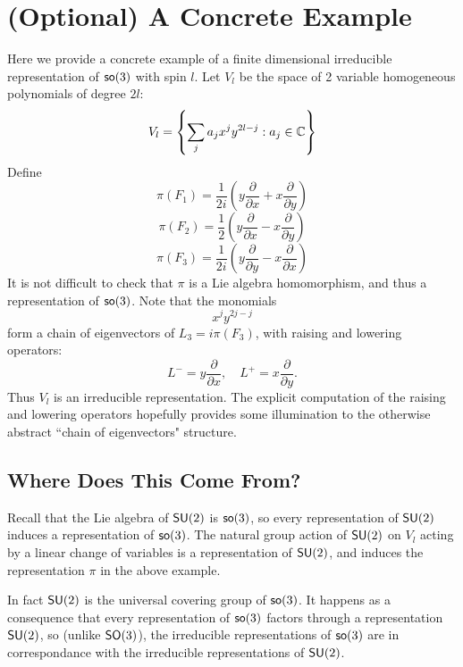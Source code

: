 \section{(Optional) A Concrete Example}
Here we provide a concrete example of a finite dimensional irreducible representation of $\operatorname{\textsf{so}}(3)$ with spin $l$. Let $V_l$ be the space of 2 variable homogeneous polynomials of degree $2l$:
\[
    V_l = \left\{ \sum_j a_j x^{j}y^{2l-j} : a_j \in {\mathbb C} \right\}
\]
Define
\[
    \pi(F_1) = \frac{1}{2i}\left(y \frac{\partial}{\partial x} + x \frac{\partial}{\partial y}\right)
\]
\[
    \pi(F_2) = \frac{1}{2}\left(y \frac{\partial}{\partial x} - x \frac{\partial}{\partial y}\right)
\]
\[
    \pi(F_3) = \frac{1}{2i}\left( y \frac{\partial}{\partial y} - x \frac{\partial}{\partial x}\right)
\]
It is not difficult to check that $\pi$ is a Lie algebra homomorphism, and thus a representation of $\operatorname{\textsf{so}}(3)$. Note that the monomials
\[
    x^jy^{2j-j}
\]
form a chain of eigenvectors of $L_3 = i\pi(F_3)$, with raising and lowering operators:
\[
    L^- = y \frac{\partial}{\partial x}, \quad L^+ = x \frac{\partial}{\partial y}.
\]
Thus $V_l$ is an irreducible representation. The explicit computation of the raising and lowering operators hopefully provides some illumination to the otherwise abstract ``chain of eigenvectors" structure.

\subsection{Where Does This Come From?}
Recall that the Lie algebra of $\operatorname{\textsf{SU}}(2)$ is $\operatorname{\textsf{so}}(3)$, so every representation of $\operatorname{\textsf{SU}}(2)$ induces a representation of $\operatorname{\textsf{so}}(3)$. The natural group action of $\operatorname{\textsf{SU}}(2)$ on $V_l$ acting by a linear change of variables is a representation of $\operatorname{\textsf{SU}}(2)$, and induces the representation $\pi$ in the above example.

\begin{remark}
    In fact $\operatorname{\textsf{SU}}(2)$ is the universal covering group of $\operatorname{\textsf{so}}(3)$. It happens as a consequence that every representation of $\operatorname{\textsf{so}}(3)$ factors through a representation $\operatorname{\textsf{SU}}(2)$, so (unlike $\operatorname{\textsf{SO}}(3)$), the irreducible representations of $\operatorname{\textsf{so}}(3)$ are in correspondance with the irreducible representations of $\operatorname{\textsf{SU}}(2)$.
\end{remark}
